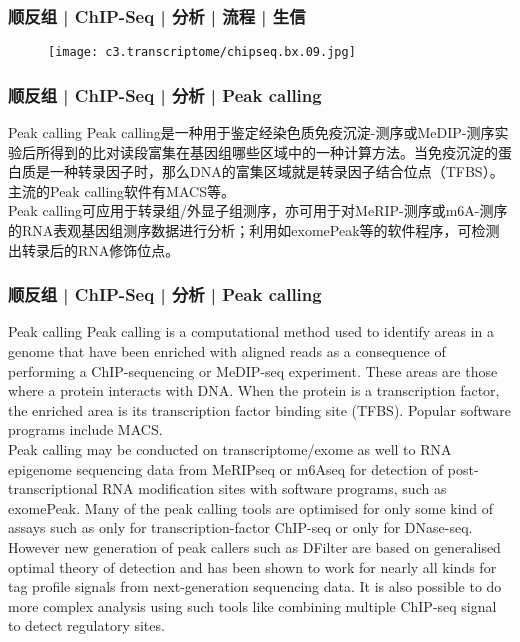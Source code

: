 \begin{frame}
  \frametitle{顺反组 | ChIP-Seq | 分析 | 流程 | 生信}
  \begin{figure}
    \centering
    \texttt{[image: c3.transcriptome/chipseq.bx.09.jpg]}
  \end{figure}
\end{frame}

\begin{frame}
  \frametitle{顺反组 | ChIP-Seq | 分析 | Peak calling}
  \begin{block}{Peak calling}
    Peak calling是一种用于鉴定经染色质免疫沉淀-测序或MeDIP-测序实验后所得到的比对读段富集在基因组哪些区域中的一种计算方法。当免疫沉淀的蛋白质是一种转录因子时，那么DNA的富集区域就是转录因子结合位点（TFBS）。主流的Peak calling软件有MACS等。\\
    \vspace{1em}
    Peak calling可应用于转录组/外显子组测序，亦可用于对MeRIP-测序或m6A-测序的RNA表观基因组测序数据进行分析；利用如exomePeak等的软件程序，可检测出转录后的RNA修饰位点。
  \end{block}
\end{frame}

\begin{frame}
  \frametitle{顺反组 | ChIP-Seq | 分析 | Peak calling}
  {\footnotesize
  \begin{block}{Peak calling}
    Peak calling is a computational method used to identify areas in a genome that have been enriched with aligned reads as a consequence of performing a ChIP-sequencing or MeDIP-seq experiment. These areas are those where a protein interacts with DNA. When the protein is a transcription factor, the enriched area is its transcription factor binding site (TFBS). Popular software programs include MACS.\\
    \vspace{1em}
    Peak calling may be conducted on transcriptome/exome as well to RNA epigenome sequencing data from MeRIPseq or m6Aseq for detection of post-transcriptional RNA modification sites with software programs, such as exomePeak. Many of the peak calling tools are optimised for only some kind of assays such as only for transcription-factor ChIP-seq or only for DNase-seq. However new generation of peak callers such as DFilter are based on generalised optimal theory of detection and has been shown to work for nearly all kinds for tag profile signals from next-generation sequencing data. It is also possible to do more complex analysis using such tools like combining multiple ChIP-seq signal to detect regulatory sites.
  \end{block}
  }
\end{frame}

